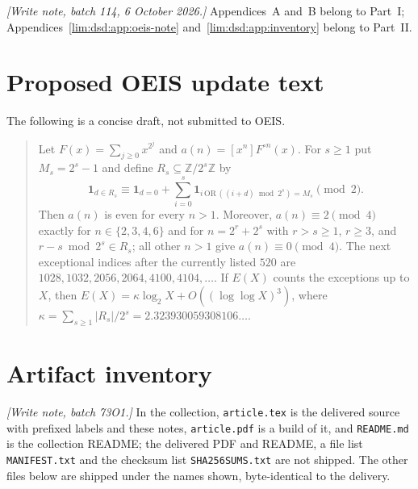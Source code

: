 \documentclass[11pt]{article}
\theoremstyle{definition}
\theoremstyle{remark}
\newcommand{\ind}{\mathbf 1}
\begin{document}
\emph{[Write note, batch 114, 6 October 2026.]} Appendices~A and~B belong to Part~I;
Appendices~\ref{lim:dsd:app:oeis-note} and~\ref{lim:dsd:app:inventory}
belong to Part~II.

\section{Proposed OEIS update text}

The following is a concise draft, not submitted to OEIS.

\begin{quote}\small
Let $F(x)=\sum_{j\ge0}x^{2^j}$ and $a(n)=[x^n]F^{\circ n}(x)$.  For $s\ge1$
put $M_s=2^s-1$ and define $R_s\subseteq\mathbb Z/2^s\mathbb Z$ by
\[
\ind_{d\in R_s}\equiv\ind_{d=0}+
\sum_{i=0}^s\ind_{i\,\mathrm{OR}\,((i+d)\bmod2^s)=M_s}\pmod2.
\]
Then $a(n)$ is even for every $n>1$.  Moreover, $a(n)\equiv2\pmod4$ exactly
for $n\in\{2,3,4,6\}$ and for
$n=2^r+2^s$ with $r>s\ge1$, $r\ge3$, and
$r-s\bmod2^s\in R_s$; all other $n>1$ give $a(n)\equiv0\pmod4$.
The next exceptional indices after the currently listed $520$ are
$1028,1032,2056,2064,4100,4104,\ldots$.  If $E(X)$ counts the exceptions up
to $X$, then
$E(X)=\kappa\log_2X+O((\log\log X)^3)$, where
$\kappa=\sum_{s\ge1}|R_s|/2^s=2.323930059308106\ldots$.
\end{quote}

\section{Artifact inventory}
\label{lim:app:inventory}

\emph{[Write note, batch 73O1.]} In the collection, \texttt{article.tex}
is the delivered source with prefixed labels and these notes,
\texttt{article.pdf} is a build of it, and \texttt{README.md} is the
collection README;
the delivered PDF and README, a file list \texttt{MANIFEST.txt} and the
checksum list \texttt{SHA256SUMS.txt} are not shipped. The other files
below are shipped under the names shown, byte-identical to the delivery.
\end{document}
